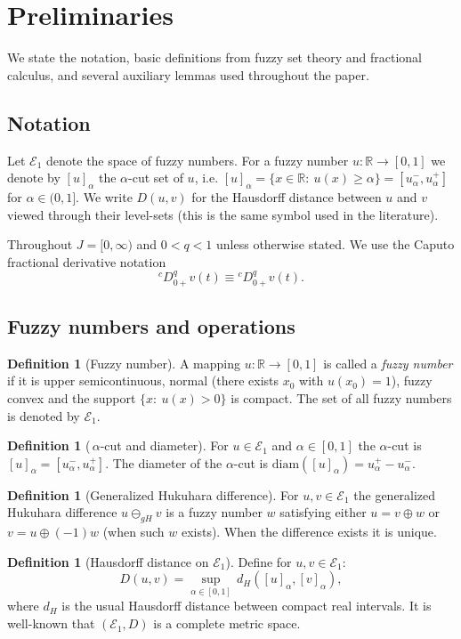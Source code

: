 \documentclass[11pt,a4paper]{article}
\theoremstyle{plain}
\theoremstyle{definition}
\newtheorem{definition}[theorem]{Definition}
\theoremstyle{remark}
\newcommand{\E}{\mathcal{E}_1}
\newcommand{\Haus}{D}
\newcommand{\capder}[2]{{}^c D_{#1+}^{#2}}
\newcommand{\R}{\mathbb{R}}
\begin{document}
	\section{Preliminaries}
	We state the notation, basic definitions from fuzzy set theory and fractional calculus, and several auxiliary lemmas used throughout the paper.
	
	\subsection{Notation}
	Let $\E$ denote the space of fuzzy numbers. For a fuzzy number $u:\R\to[0,1]$ we denote by $[u]_\alpha$ the $\alpha$-cut set of $u$, i.e. $[u]_\alpha=\{x\in\R:\ u(x)\ge\alpha\}=[u_\alpha^-,u_\alpha^+]$ for $\alpha\in(0,1]$. We write $\Haus(u,v)$ for the Hausdorff distance between $u$ and $v$ viewed through their level-sets (this is the same symbol used in the literature).
	
	Throughout $J=[0,\infty)$ and $0<q<1$ unless otherwise stated. We use the Caputo fractional derivative notation $$\capder{0}{q} v(t)\equiv {}^cD_{0+}^q v(t).$$
	
	\subsection{Fuzzy numbers and operations}
	\begin{definition}[Fuzzy number]
		A mapping $u:\R\to[0,1]$ is called a \emph{fuzzy number} if it is upper semicontinuous, normal (there exists $x_0$ with $u(x_0)=1$), fuzzy convex and the support $\{x:\ u(x)>0\}$ is compact. The set of all fuzzy numbers is denoted by $\E$.
	\end{definition}
	
	\begin{definition}[\,$\alpha$-cut and diameter]
		For $u\in\E$ and $\alpha\in[0,1]$ the $\alpha$-cut is $[u]_\alpha=[u_\alpha^-,u_\alpha^+]$. The diameter of the $\alpha$-cut is $\mathrm{diam}([u]_\alpha)=u_\alpha^+-u_\alpha^-$.
	\end{definition}
	
	\begin{definition}[Generalized Hukuhara difference]
		For $u,v\in\E$ the generalized Hukuhara difference $u\ominus_{gH} v$ is a fuzzy number $w$ satisfying either $u=v\oplus w$ or $v=u\oplus (-1)w$ (when such $w$ exists). When the difference exists it is unique.
	\end{definition}
	
	\begin{definition}[Hausdorff distance on $\E$]
		Define for $u,v\in\E$:
		$$\Haus(u,v)=\sup_{\alpha\in[0,1]}\, d_H([u]_\alpha,[v]_\alpha),$$
		where $d_H$ is the usual Hausdorff distance between compact real intervals. It is well-known that $(\E,\Haus)$ is a complete metric space.
	\end{definition}
	
\end{document}

